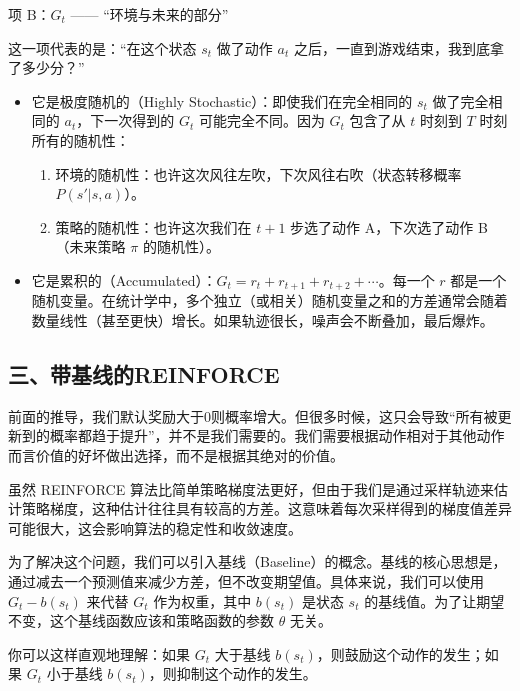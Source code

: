 项 B：\(G_t\) ------ ``环境与未来的部分''

这一项代表的是：``在这个状态 \(s_t\) 做了动作 \(a_t\) 之后，一直到游戏结束，我到底拿了多少分？''

\begin{itemize}
\tightlist
\item
{}
  它是极度随机的（Highly Stochastic）：即使我们在完全相同的 \(s_t\) 做了完全相同的 \(a_t\)，下一次得到的 \(G_t\) 可能完全不同。因为 \(G_t\) 包含了从 \(t\) 时刻到 \(T\) 时刻所有的随机性：

  \begin{enumerate}
  \def\labelenumi{\arabic{enumi}.}
  \tightlist
  \item
    环境的随机性：也许这次风往左吹，下次风往右吹（状态转移概率 \(P(s'|s,a)\)）。
  \item
    策略的随机性：也许这次我们在 \(t+1\) 步选了动作 A，下次选了动作 B（未来策略 \(\pi\) 的随机性）。
  \end{enumerate}
\item
  它是累积的（Accumulated）：\(G_t=r_t+r_{t+1}+r_{t+2}+\cdots\)。每一个 \(r\) 都是一个随机变量。在统计学中，多个独立（或相关）随机变量之和的方差通常会随着数量线性（甚至更快）增长。如果轨迹很长，噪声会不断叠加，最后爆炸。
\end{itemize}

\hypertarget{ux4e09ux5e26ux57faux7ebfux7684reinforce}{%
\subsection{三、带基线的REINFORCE}\label{ux4e09ux5e26ux57faux7ebfux7684reinforce}}

前面的推导，我们默认奖励大于0则概率增大。但很多时候，这只会导致``所有被更新到的概率都趋于提升''，并不是我们需要的。我们需要根据动作相对于其他动作而言价值的好坏做出选择，而不是根据其绝对的价值。

虽然 REINFORCE 算法比简单策略梯度法更好，但由于我们是通过采样轨迹来估计策略梯度，这种估计往往具有较高的方差。这意味着每次采样得到的梯度值差异可能很大，这会影响算法的稳定性和收敛速度。

为了解决这个问题，我们可以引入基线（Baseline）的概念。基线的核心思想是，通过减去一个预测值来减少方差，但不改变期望值。具体来说，我们可以使用 \(G_t-b(s_t)\) 来代替 \(G_t\) 作为权重，其中 \(b(s_t)\) 是状态 \(s_t\) 的基线值。为了让期望不变，这个基线函数应该和策略函数的参数 \(\theta\) 无关。

你可以这样直观地理解：如果 \(G_t\) 大于基线 \(b(s_t)\)，则鼓励这个动作的发生；如果 \(G_t\) 小于基线 \(b(s_t)\)，则抑制这个动作的发生。

